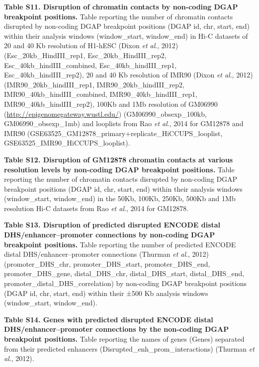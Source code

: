 \documentclass[a4paper,twoside=true,openright,parskip=full,chapterprefix=true,11pt,headings=normal,bibliography=totoc,listof=totoc,titlepage=on,captions=tableabove,draft=false]{scrreprt}
\theoremstyle{definition}
\theoremstyle{definition}
\theoremstyle{definition}
\theoremstyle{remark}
\begin{document}
\textbf{Table S11. Disruption of chromatin contacts by non-coding DGAP
breakpoint positions.} Table reporting the number of chromatin contacts
disrupted by non-coding DGAP breakpoint positions (DGAP id, chr, start,
end) within their analysis windows (window\_start, window\_end) in Hi-C
datasets of 20 and 40 Kb resolution of H1-hESC (Dixon \emph{et al}.,
2012) (Esc\_20kb\_HindIII\_rep1, Esc\_20kb\_HindIII\_rep2,
Esc\_40kb\_hindIII\_combined, Esc\_40kb\_hindIII\_rep1,
Esc\_40kb\_hindIII\_rep2), 20 and 40 Kb resolution of IMR90 (Dixon
\emph{et al}., 2012) (IMR90\_20kb\_hindIII\_rep1,
IMR90\_20kb\_hindIII\_rep2, IMR90\_40kb\_hindIII\_combined,
IMR90\_40kb\_hindIII\_rep1, IMR90\_40kb\_hindIII\_rep2), 100Kb and 1Mb
resolution of GM06990 (\url{http://epigenomegateway.wustl.edu/})
(GM06990\_obsexp\_100kb, GM06990\_obsexp\_1mb) and looplists from Rao
\emph{et al}., 2014 for GM12878 and IMR90
(GSE63525\_GM12878\_primary+replicate\_HiCCUPS\_looplist,
GSE63525\_IMR90\_HiCCUPS\_looplist).

\textbf{Table S12. Disruption of GM12878 chromatin contacts at various
resolution levels by non-coding DGAP breakpoint positions.} Table
reporting the number of chromatin contacts disrupted by non-coding DGAP
breakpoint positions (DGAP id, chr, start, end) within their analysis
windows (window\_start, window\_end) in the 50Kb, 100Kb, 250Kb, 500Kb
and 1Mb resolution Hi-C datasets from Rao \emph{et al}., 2014 for
GM12878.

\textbf{Table S13. Disruption of predicted disrupted ENCODE distal
DHS/enhancer--promoter connections by non-coding DGAP breakpoint
positions.} Table reporting the number of predicted ENCODE distal
DHS/enhancer--promoter connections (Thurman \emph{et al}., 2012)
(promoter\_DHS\_chr, promoter\_DHS\_start, promoter\_DHS\_end,
promoter\_DHS\_gene, distal\_DHS\_chr, distal\_DHS\_start,
distal\_DHS\_end, promoter\_distal\_DHS\_correlation) by non-coding DGAP
breakpoint positions (DGAP id, chr, start, end) within their ±500 Kb
analysis windows (window\_start, window\_end).

\textbf{Table S14. Genes with predicted disrupted ENCODE distal
DHS/enhancer--promoter connections by the non-coding DGAP breakpoint
positions.} Table reporting the names of genes (Genes) separated from
their predicted enhancers (Disrupted\_enh\_prom\_interactions) (Thurman
\emph{et al}., 2012).
\end{document}
